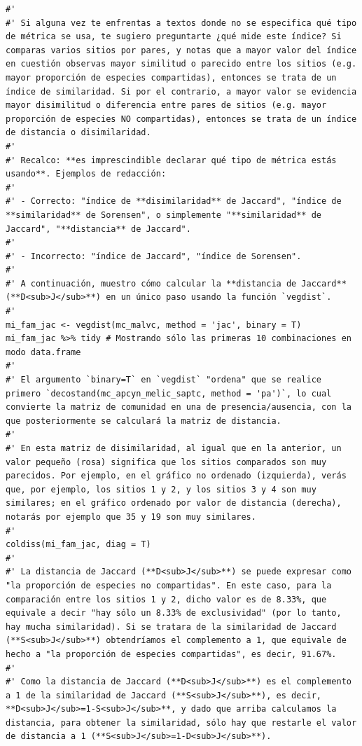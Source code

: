 \documentclass[11pt,]{article}
\begin{document}
\begin{verbatim}
#' 
#' Si alguna vez te enfrentas a textos donde no se especifica qué tipo de métrica se usa, te sugiero preguntarte ¿qué mide este índice? Si comparas varios sitios por pares, y notas que a mayor valor del índice en cuestión observas mayor similitud o parecido entre los sitios (e.g. mayor proporción de especies compartidas), entonces se trata de un índice de similaridad. Si por el contrario, a mayor valor se evidencia mayor disimilitud o diferencia entre pares de sitios (e.g. mayor proporción de especies NO compartidas), entonces se trata de un índice de distancia o disimilaridad.
#' 
#' Recalco: **es imprescindible declarar qué tipo de métrica estás usando**. Ejemplos de redacción:
#' 
#' - Correcto: "índice de **disimilaridad** de Jaccard", "índice de **similaridad** de Sorensen", o simplemente "**similaridad** de Jaccard", "**distancia** de Jaccard".
#' 
#' - Incorrecto: "índice de Jaccard", "índice de Sorensen".
#' 
#' A continuación, muestro cómo calcular la **distancia de Jaccard** (**D<sub>J</sub>**) en un único paso usando la función `vegdist`.
#' 
mi_fam_jac <- vegdist(mc_malvc, method = 'jac', binary = T)
mi_fam_jac %>% tidy # Mostrando sólo las primeras 10 combinaciones en modo data.frame
#' 
#' El argumento `binary=T` en `vegdist` "ordena" que se realice primero `decostand(mc_apcyn_melic_saptc, method = 'pa')`, lo cual convierte la matriz de comunidad en una de presencia/ausencia, con la que posteriormente se calculará la matriz de distancia.
#' 
#' En esta matriz de disimilaridad, al igual que en la anterior, un valor pequeño (rosa) significa que los sitios comparados son muy parecidos. Por ejemplo, en el gráfico no ordenado (izquierda), verás que, por ejemplo, los sitios 1 y 2, y los sitios 3 y 4 son muy similares; en el gráfico ordenado por valor de distancia (derecha), notarás por ejemplo que 35 y 19 son muy similares.
#'  
coldiss(mi_fam_jac, diag = T)
#' 
#' La distancia de Jaccard (**D<sub>J</sub>**) se puede expresar como "la proporción de especies no compartidas". En este caso, para la comparación entre los sitios 1 y 2, dicho valor es de 8.33%, que equivale a decir "hay sólo un 8.33% de exclusividad" (por lo tanto, hay mucha similaridad). Si se tratara de la similaridad de Jaccard (**S<sub>J</sub>**) obtendríamos el complemento a 1, que equivale de hecho a "la proporción de especies compartidas", es decir, 91.67%.
#' 
#' Como la distancia de Jaccard (**D<sub>J</sub>**) es el complemento a 1 de la similaridad de Jaccard (**S<sub>J</sub>**), es decir, **D<sub>J</sub>=1-S<sub>J</sub>**, y dado que arriba calculamos la distancia, para obtener la similaridad, sólo hay que restarle el valor de distancia a 1 (**S<sub>J</sub>=1-D<sub>J</sub>**).

\end{verbatim}
\end{document}
